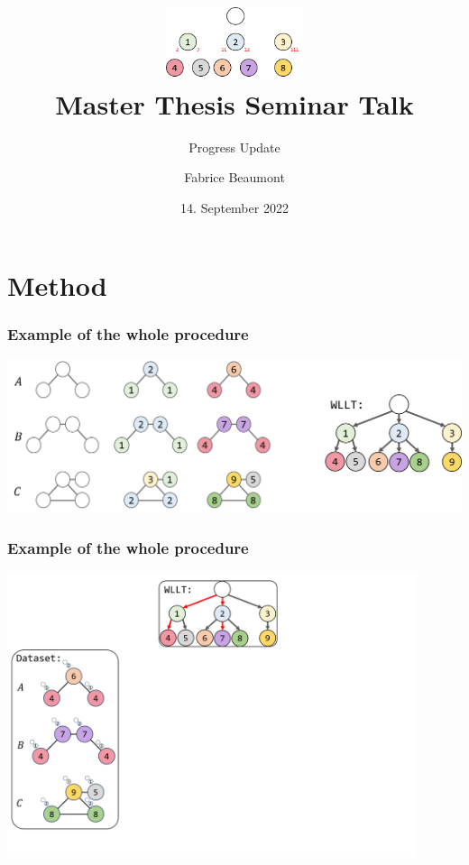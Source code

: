 

\title[MA Seminar Talk - Progress]{
	\centering
	\includegraphics[width=0.3\textwidth]{images/WLLT}\\
	Master Thesis Seminar Talk	
}
\subtitle{Progress Update}
\author[F. Beaumont]{Fabrice Beaumont}
\date{14. September 2022}

\newcommand{\figureWidth}{7cm}
\newcommand{\figureHorizontal}{2cm}
\newcommand{\figureVertical}{5cm}



\begin{frame}
	\titlepage
\end{frame}

\section{Method}


\begin{frame}
\frametitle{Example of the whole procedure}
\centering
\includegraphics[width=1.0\textwidth]{images/WL_labeling_iterations}
\end{frame}


\begin{frame}
	\frametitle{Example of the whole procedure}\vspace{-0.75cm}
	\centering
	\includegraphics[width=0.9\textwidth]{images/WLLTProgram1}
\end{frame}


